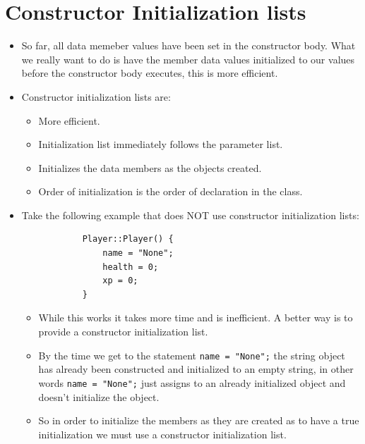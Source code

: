\section{Constructor Initialization lists} 
\begin{itemize}
    \item So far, all data memeber values have been set in the constructor body. What we really want to do is have the member data values initialized to our values before the constructor body executes, this is more efficient.
    \item Constructor initialization lists are: 
        \begin{itemize}
            \item More efficient.
            \item Initialization list immediately follows the parameter list.
            \item Initializes the data members as the objects created.
            \item Order of initialization is the order of declaration in the class.
        \end{itemize}
    
    \item Take the following example that does NOT use constructor initialization lists:
        \begin{verbatim}
            Player::Player() {
                name = "None";
                health = 0;
                xp = 0;
            }
        \end{verbatim}
        \begin{itemize}
            \item While this works it takes more time and is inefficient. A better way is to provide a constructor initialization list.
            \item By the time we get to the statement \texttt{name = "None";} the string object has already been constructed and initialized to an empty string, in other words \texttt{name = "None";} just assigns to an already initialized object and doesn't initialize the object.
            \item So in order to initialize the members as they are created as to have a true initialization we must use a constructor initialization list.
        \end{itemize}
    

\end{itemize}

